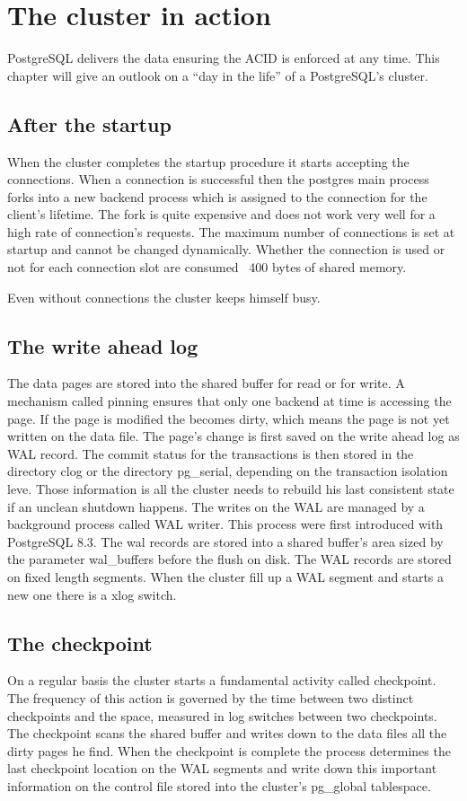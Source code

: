 \chapter{The cluster in action}
PostgreSQL delivers the data ensuring the ACID is enforced at any time. This chapter will give an outlook 
on a ``day in the life'' of a PostgreSQL's cluster.

\section{After the startup}
When the cluster completes the startup procedure it starts accepting the connections. When a connection  
is successful then the postgres main process forks into a new backend process which is assigned to the 
connection for the client's lifetime. The fork is quite expensive and does not work very well for a high 
rate of connection's requests. The maximum number of connections is set at startup and cannot be changed 
dynamically. Whether the connection is used or not for each connection slot are consumed ~400 bytes of 
shared memory.\newline

Even without connections the cluster keeps himself busy. 

\section{The write ahead log}
The  data pages are stored into the shared buffer for read or for write. A mechanism 
called pinning ensures that only one backend at time is accessing the page. If the page 
is modified the becomes dirty, which 
means the page is not yet written on the data file. The page's change is first saved on the write ahead log 
as WAL record. The commit status for the transactions is then stored in the directory clog or the directory
pg\_serial, depending on the transaction isolation leve. Those information is all the cluster needs to 
rebuild his last consistent state if an unclean shutdown happens. The writes on the WAL are managed by a 
background process called WAL writer. This process were first introduced with PostgreSQL 
8.3. The wal records are stored into a shared buffer's area sized by the parameter wal\_buffers before the 
flush on disk. The WAL records are stored on fixed length segments. When the cluster fill up a WAL segment 
and starts a new one there is a xlog switch.

\section{The checkpoint}
On a regular basis the cluster starts a fundamental activity called checkpoint. The frequency of this 
action is governed by the time between two distinct checkpoints and the space, measured in log 
switches between two checkpoints. The checkpoint scans the shared buffer and writes down to the data 
files all the dirty pages he find. When the checkpoint is complete the process determines the last 
checkpoint location on the WAL segments and write down this important information on the control file 
stored into the cluster's pg\_global tablespace.


